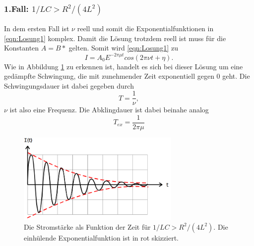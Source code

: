 \subsubsection*{1.Fall: $1/LC>R^2/(4L^2)$}
In dem ersten Fall ist $\nu$ reell und somit die Exponentialfunktionen in \eqref{eqn:Losung1} komplex. Damit die Lösung trotzdem reell ist muss
für die Konstanten $A=B*$ gelten. Somit wird \eqref{eqn:Losung1} zu
\begin{equation}
    I=A_0E^{-2\pi\mu t} cos(2\pi\nu t+\eta).
    \label{eqn:Fall1}
\end{equation}
Wie in Abbildung \ref{fig:Fall1} zu erkennen ist, handelt es sich bei dieser Lösung um eine gedämpfte Schwingung, die mit zunehmender Zeit 
exponentiell gegen 0 geht. Die Schwingungsdauer ist dabei gegeben durch
\begin{equation*}
    T=\frac{1}{\nu} ,
\end{equation*}
$\nu$ ist also eine Frequenz. Die Abklingdauer ist dabei beinahe analog
\begin{equation}
    T_{ex}=\frac{1}{2\pi\mu}
    \label{eqn:Tex}
\end{equation}
\begin{figure}[H]
    \centering
    \includegraphics[width=0.7\textwidth]{pictures/Fall1.png}
    \caption{Die Stromstärke als Funktion der Zeit für $1/LC>R^2/(4L^2)$. Die einhülende Exponentialfunktion ist in rot skizziert.\cite{AP01}}
    \label{fig:Fall1}
\end{figure}


